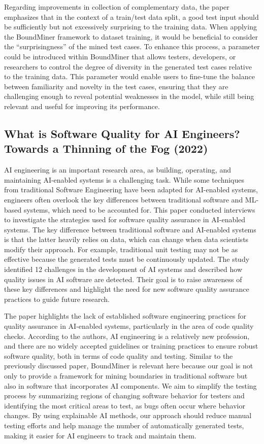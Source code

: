 \documentclass[11pt]{article}
\begin{document}
Regarding improvements in collection of complementary data, the paper emphasizes that in the context of a train/test data split, a good test input should be sufficiently but not excessively surprising to the training data. When applying the BoundMiner framework to dataset training, it would be beneficial to consider the “surprisingness” of the mined test cases. To enhance this process, a parameter could be introduced within BoundMiner that allows testers, developers, or researchers to control the degree of diversity in the generated test cases relative to the training data. This parameter would enable users to fine-tune the balance between familiarity and novelty in the test cases, ensuring that they are challenging enough to reveal potential weaknesses in the model, while still being relevant and useful for improving its performance. 

\subsection{What is Software Quality for AI Engineers? Towards a Thinning of the Fog (2022)}

AI engineering is an important research area, as building, operating, and maintaining AI-enabled systems is a challenging task. While some techniques from traditional Software Engineering have been adapted for AI-enabled systems, engineers often overlook the key differences between traditional software and ML-based systems, which need to be accounted for. This paper conducted interviews to investigate the strategies used for software quality assurance in AI-enabled systems. The key difference between traditional software and AI-enabled systems is that the latter heavily relies on data, which can change when data scientists modify their approach. For example, traditional unit testing may not be as effective because the generated tests must be continuously updated. The study identified 12 challenges in the development of AI systems and described how quality issues in AI software are detected. Their goal is to raise awareness of these key differences and highlight the need for new software quality assurance practices to guide future research.

The paper highlights the lack of established software engineering practices for quality assurance in AI-enabled systems, particularly in the area of code quality checks. According to the authors, AI engineering is a relatively new profession, and there are no widely accepted guidelines or training practices to ensure robust software quality, both in terms of code quality and testing. Similar to the previously discussed paper, BoundMiner is relevant here because our goal is not only to provide a framework for mining boundaries in traditional software but also in software that incorporates AI components. We aim to simplify the testing process by summarizing regions of changing software behavior for testers and identifying the most critical areas to test, as bugs often occur where behavior changes. By using explainable AI methods, our approach should reduce manual testing efforts and help manage the number of automatically generated tests, making it easier for AI engineers to track and maintain them.
\end{document}
